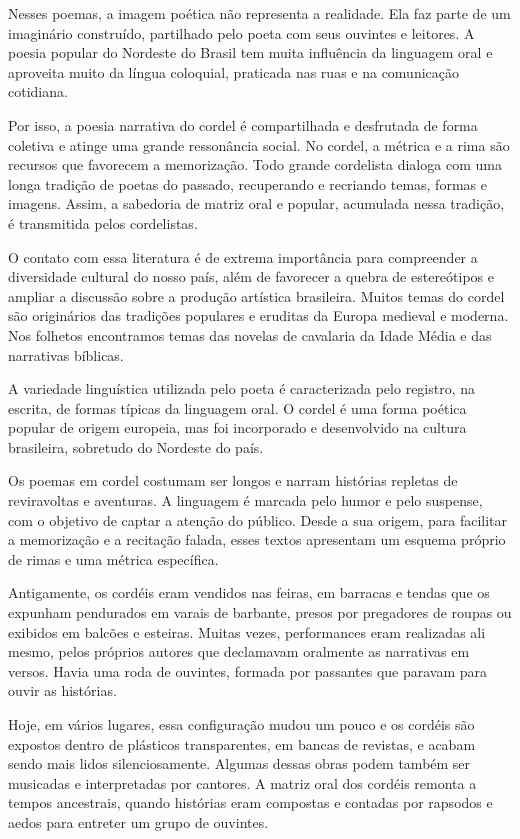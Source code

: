\documentclass[12pt]{extarticle}
\begin{document}
Nesses poemas, a imagem poética não representa a realidade. Ela faz parte de um
imaginário construído, partilhado pelo poeta com seus ouvintes e leitores.
A poesia popular do Nordeste do Brasil tem muita influência da linguagem oral
e aproveita muito da língua coloquial, praticada nas ruas e na comunicação
cotidiana.

Por isso, a poesia narrativa do cordel é compartilhada e desfrutada de forma
coletiva e atinge uma grande ressonância social. No cordel, a métrica e a rima
são recursos que favorecem a memorização. Todo grande cordelista dialoga com
uma longa tradição de poetas do passado, recuperando e recriando temas, formas
e imagens. Assim, a sabedoria de matriz oral e popular, acumulada nessa
tradição, é transmitida pelos cordelistas. 

O contato com essa literatura é de extrema importância para compreender
a diversidade cultural do nosso país, além de favorecer a quebra de
estereótipos e ampliar a discussão sobre a produção artística brasileira.
Muitos temas do cordel são originários das tradições populares e eruditas da
Europa medieval e moderna. Nos folhetos encontramos temas das novelas de
cavalaria da Idade Média e das narrativas bíblicas.

A variedade linguística utilizada pelo poeta é caracterizada pelo registro, na
escrita, de formas típicas da linguagem oral. O cordel é uma forma poética
popular de origem europeia, mas foi incorporado e desenvolvido na cultura
brasileira, sobretudo do Nordeste do país.




Os poemas em cordel costumam ser longos e narram histórias repletas de
reviravoltas e aventuras. A linguagem é marcada pelo humor e pelo suspense, com
o objetivo de captar a atenção do público. Desde a sua origem, para facilitar
a memorização e a recitação falada, esses textos apresentam um esquema próprio
de rimas e uma métrica específica. 

Antigamente, os cordéis eram vendidos nas feiras, em barracas e tendas que os
expunham pendurados em varais de barbante, presos por pregadores de roupas ou
exibidos em balcões e esteiras. Muitas vezes, performances eram realizadas ali
mesmo, pelos próprios autores que declamavam oralmente as narrativas em versos.
Havia uma roda de ouvintes, formada por passantes que paravam para ouvir as
histórias.

Hoje, em vários lugares, essa configuração mudou um pouco e os cordéis são
expostos dentro de plásticos transparentes, em bancas de revistas, e acabam
sendo mais lidos silenciosamente. Algumas dessas obras podem também ser
musicadas e interpretadas por cantores. A matriz oral dos cordéis remonta
a tempos ancestrais, quando histórias eram compostas e contadas por rapsodos
e aedos para entreter um grupo de ouvintes.
\end{document}
